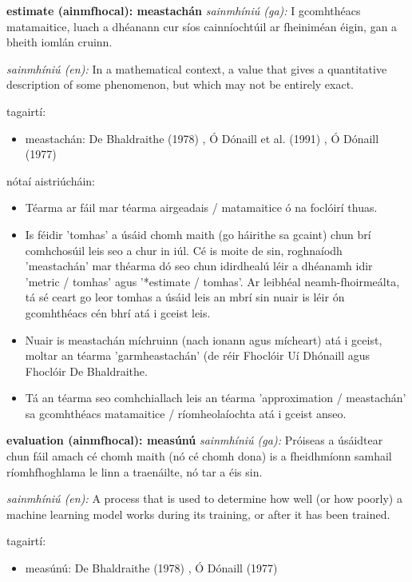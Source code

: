 \documentclass{article}
\begin{document}
\textbf{estimate (ainmfhocal): meastachán}
\textit{sainmhíniú (ga):} I gcomhthéacs matamaitice, luach a dhéanann cur síos cainníochtúil ar fheiniméan éigin, gan a bheith iomlán cruinn.

\textit{sainmhíniú (en):} In a mathematical context, a value that gives a quantitative description of some phenomenon, but which may not be entirely exact.

tagairtí:
\begin{itemize}
	\item meastachán: De Bhaldraithe (1978) \cite{de-bhaldraithe}, Ó Dónaill et al. (1991) \cite{focloir-beag}, Ó Dónaill (1977) \cite{odonaill}
\end{itemize}

nótaí aistriúcháin:
\begin{itemize}
	\item Téarma ar fáil mar téarma airgeadais / matamaitice ó na foclóirí thuas.
	\item Is féidir 'tomhas' a úsáid chomh maith (go háirithe sa gcaint) chun brí comhchosúil leis seo a chur in iúl. Cé is moite de sin, roghnaíodh 'meastachán' mar théarma dó seo chun idirdhealú léir a dhéanamh idir 'metric / tomhas' agus '*estimate / tomhas'. Ar leibhéal neamh-fhoirmeálta, tá sé ceart go leor tomhas a úsáid leis an mbrí sin nuair is léir ón gcomhthéacs cén bhrí atá i gceist leis.
	\item Nuair is meastachán míchruinn (nach ionann agus mícheart) atá i gceist, moltar an téarma 'garmheastachán' (de réir Fhoclóir Uí Dhónaill agus Fhoclóir De  Bhaldraithe.
	\item Tá an téarma seo comhchiallach leis an téarma 'approximation / meastachán' sa gcomhthéacs matamaitice / ríomheolaíochta atá i gceist anseo.
\end{itemize}


\textbf{evaluation (ainmfhocal): measúnú}
\textit{sainmhíniú (ga):} Próiseas a úsáidtear chun fáil amach cé chomh maith (nó cé chomh dona) is a fheidhmíonn samhail ríomhfhoghlama le linn a traenáilte, nó tar a éis sin.

\textit{sainmhíniú (en):} A process that is used to determine how well (or how poorly) a machine learning model works during its training, or after it has been trained.

tagairtí:
\begin{itemize}
	\item measúnú: De Bhaldraithe (1978) \cite{de-bhaldraithe}, Ó Dónaill (1977) \cite{odonaill}
\end{itemize}
\end{document}
